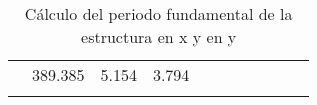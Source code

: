 \begin{table}[h]
{\begin{tabular}{|c|c|c|c|c|c|c|c|c|cc}
                                                                            & 389.385
                                                                            & 5.154
                                                                                & 3.794
                                                                              & \multicolumn{1}{l}{}                                                                      & \multicolumn{1}{l}{}                                                                       \\
\hhline{|--~~~----~~}
\end{tabular}}
\caption{Cálculo del periodo fundamental de la estructura en x y en y}
\label{tab:CALCT}
\end{table}